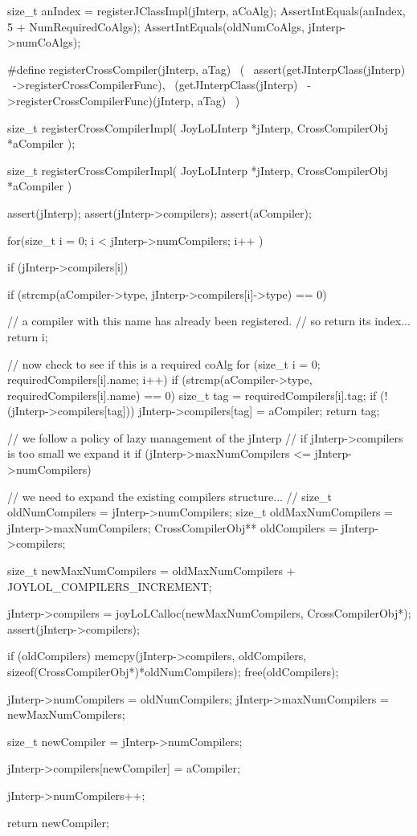   size_t anIndex = registerJClassImpl(jInterp, aCoAlg);
  AssertIntEquals(anIndex, 5 + NumRequiredCoAlgs);
  AssertIntEquals(oldNumCoAlgs, jInterp->numCoAlgs);
\stopCTest
\stopTestCase
\stopTestSuite

\startTestSuite[registerCrossCompiler]

\startCHeader
#define registerCrossCompiler(jInterp, aTag)      \
  (                                               \
    assert(getJInterpClass(jInterp)               \
      ->registerCrossCompilerFunc),               \
    (getJInterpClass(jInterp)                     \
      ->registerCrossCompilerFunc)(jInterp, aTag) \
  )
\stopCHeader

\setCHeaderStream{private}
\startCHeader
size_t registerCrossCompilerImpl(
  JoyLoLInterp     *jInterp,
  CrossCompilerObj *aCompiler
);
\stopCHeader
{}

\startCCode
size_t registerCrossCompilerImpl(
  JoyLoLInterp     *jInterp,
  CrossCompilerObj *aCompiler
) {
  assert(jInterp);
  assert(jInterp->compilers);
  assert(aCompiler);
  
  for(size_t i = 0; i < jInterp->numCompilers; i++ ) {
    if (jInterp->compilers[i]) {
      if (strcmp(aCompiler->type,
        jInterp->compilers[i]->type) == 0) {
    
        // a compiler with this name has already been registered. 
        // so return its index...
        return i;
      }
    }
  }

  // now check to see if this is a required coAlg
  for (size_t i = 0; requiredCompilers[i].name; i++) {
    if (strcmp(aCompiler->type, requiredCompilers[i].name) == 0) {
      size_t tag = requiredCompilers[i].tag;
      if (!(jInterp->compilers[tag])) {
        jInterp->compilers[tag] = aCompiler;
      }
      return tag;
    }
  }

  // we follow a policy of lazy management of the jInterp
  // if jInterp->compilers is too small we expand it
  if (jInterp->maxNumCompilers <= jInterp->numCompilers) {
    // we need to expand the existing compilers structure...
    //  
    size_t oldNumCompilers          = jInterp->numCompilers;
    size_t oldMaxNumCompilers       = jInterp->maxNumCompilers;
    CrossCompilerObj** oldCompilers = jInterp->compilers;
    
    size_t newMaxNumCompilers =
      oldMaxNumCompilers + JOYLOL_COMPILERS_INCREMENT;

    jInterp->compilers =
      joyLoLCalloc(newMaxNumCompilers, CrossCompilerObj*);
    assert(jInterp->compilers);
    
    if (oldCompilers) {
      memcpy(jInterp->compilers,
        oldCompilers,
        sizeof(CrossCompilerObj*)*oldNumCompilers);
      free(oldCompilers);
    }
    
    jInterp->numCompilers    = oldNumCompilers;
    jInterp->maxNumCompilers = newMaxNumCompilers;
  }
  
  size_t newCompiler = jInterp->numCompilers;
  
  jInterp->compilers[newCompiler] = aCompiler;
  
  jInterp->numCompilers++;
  
  return newCompiler;
}
\stopCCode

